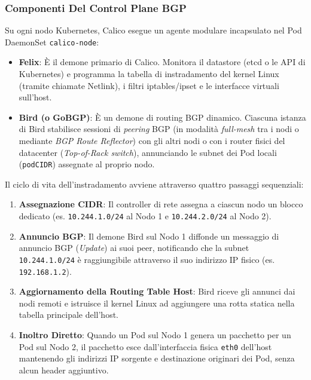 \documentclass[11pt, a4paper]{article}
\begin{document}
\subsubsection{Componenti Del Control Plane BGP}
Su ogni nodo Kubernetes, Calico esegue un agente modulare incapsulato nel Pod DaemonSet \texttt{calico-node}:
\begin{itemize}[noitemsep]
    \item \textbf{Felix}: È il demone primario di Calico. Monitora il datastore (etcd o le API di Kubernetes) e programma la tabella di instradamento del kernel Linux (tramite chiamate Netlink), i filtri iptables/ipset e le interfacce virtuali sull'host.
    \item \textbf{Bird (o GoBGP)}: È un demone di routing BGP dinamico. Ciascuna istanza di Bird stabilisce sessioni di \emph{peering} BGP (in modalità \emph{full-mesh} tra i nodi o mediante \emph{BGP Route Reflector}) con gli altri nodi o con i router fisici del datacenter (\emph{Top-of-Rack switch}), annunciando le subnet dei Pod locali (\texttt{podCIDR}) assegnate al proprio nodo.
\end{itemize}


Il ciclo di vita dell'instradamento avviene attraverso quattro passaggi sequenziali:
\begin{enumerate}[noitemsep]
    \item \textbf{Assegnazione CIDR}: Il controller di rete assegna a ciascun nodo un blocco dedicato (es. \texttt{10.244.1.0/24} al Nodo 1 e \texttt{10.244.2.0/24} al Nodo 2).
    \item \textbf{Annuncio BGP}: Il demone Bird sul Nodo 1 diffonde un messaggio di annuncio BGP (\emph{Update}) ai suoi peer, notificando che la subnet \texttt{10.244.1.0/24} è raggiungibile attraverso il suo indirizzo IP fisico (es. \texttt{192.168.1.2}).
    \item \textbf{Aggiornamento della Routing Table Host}: Bird riceve gli annunci dai nodi remoti e istruisce il kernel Linux ad aggiungere una rotta statica nella tabella principale dell'host.
    \item \textbf{Inoltro Diretto}: Quando un Pod sul Nodo 1 genera un pacchetto per un Pod sul Nodo 2, il pacchetto esce dall'interfaccia fisica \texttt{eth0} dell'host mantenendo gli indirizzi IP sorgente e destinazione originari dei Pod, senza alcun header aggiuntivo.
\end{enumerate}
\end{document}
